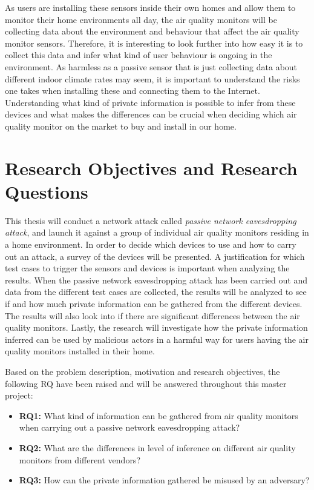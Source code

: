 As users are installing these sensors inside their own homes and allow them to monitor their home environments all day, the air quality monitors will be collecting data about the environment and behaviour that affect the air quality monitor sensors. Therefore, it is interesting to look further into how easy it is to collect this data and infer what kind of user behaviour is ongoing in the environment. As harmless as a passive sensor that is just collecting data about different indoor climate rates may seem, it is important to understand the risks one takes when installing these and connecting them to the Internet. Understanding what kind of private information is possible to infer from these devices and what makes the differences can be crucial when deciding which air quality monitor on the market to buy and install in our home.

\section{Research Objectives and Research Questions}
This thesis will conduct a network attack called \textit{passive network eavesdropping attack}, and launch it against a group of individual air quality monitors residing in a home environment. In order to decide which devices to use and how to carry out an attack, a survey of the devices will be presented. A justification for which test cases to trigger the sensors and devices is important when analyzing the results. When the passive network eavesdropping attack has been carried out and data  from the different test cases are collected, the results will be analyzed to see if and how much private information can be gathered from the different devices. The results will also look into if there are significant differences between the air quality monitors. Lastly, the research will investigate how the private information inferred can be used by malicious actors in a harmful way for users having the air quality monitors installed in their home.

Based on the problem description, motivation and research objectives, the following \gls{RQ} have been raised and will be answered throughout this master project:
\begin{itemize}
    \item 
    \textbf{\gls{RQ}1:} What kind of information can be gathered from air quality monitors when carrying out a passive network eavesdropping attack?\\
    \item 
    \textbf{\gls{RQ}2:} What are the differences in level of inference on different air quality monitors from different vendors?\\
    \item 
    \textbf{\gls{RQ}3:} How can the private information gathered be misused by an adversary?\\
\end{itemize}


